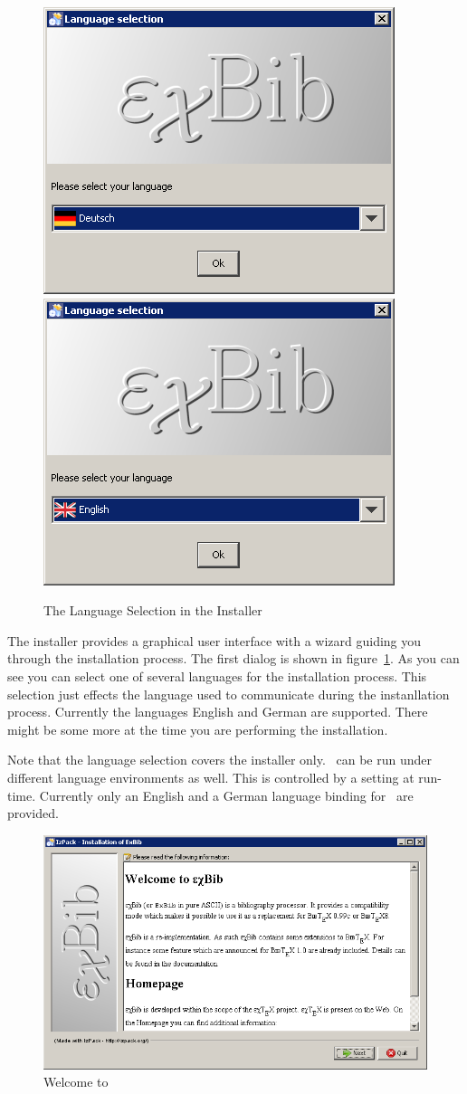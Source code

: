 \begin{figure}[!ht]
  \centering
  \includegraphics[width=.45\textwidth]{img/inst1}\hfill
  \includegraphics[width=.45\textwidth]{img/inst2}
  \caption{The Language Selection in the Installer}
  \label{fig:inst1}
\end{figure}
The installer provides a graphical user interface with a wizard
guiding you through the installation process. The first dialog is
shown in figure~\ref{fig:inst1}. As you can see you can select one of
several languages for the installation process. This selection just
effects the language used to communicate during the instanllation
process.  Currently the languages English and German are supported.
There might be some more at the time you are performing the
installation.

Note that the language selection covers the installer only. \ExBib\ 
can be run under different language environments as well. This is
controlled by a setting at run-time. Currently only an English and
a German language binding for \ExBib\ are provided.\index{language}

\begin{figure}[!ht]
  \centering
  \includegraphics[width=.45\textwidth]{img/inst3}
  \caption{Welcome to \ExBib}
  \label{fig:inst2}
\end{figure}

